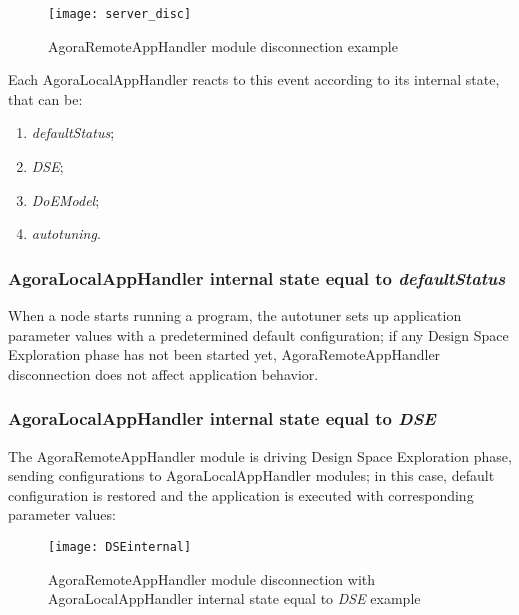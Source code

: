 \begin{figure}[H]

    \centering
    \texttt{[image: server\_disc]}
    \caption{AgoraRemoteAppHandler module disconnection example}
    
\end{figure}

Each AgoraLocalAppHandler reacts to this event according to its internal state, that can be:

\begin{enumerate}

    \item \textit{defaultStatus};
    
    \item \textit{DSE};
    
    \item \textit{DoEModel};
    
    \item \textit{autotuning}.

\end{enumerate}


\subsubsection{AgoraLocalAppHandler internal state equal to \textit{defaultStatus}}

When a node starts running a program, the autotuner sets up application parameter values with a predetermined default configuration; if any Design Space Exploration phase has not been started yet, AgoraRemoteAppHandler disconnection does not affect application behavior.


\subsubsection{AgoraLocalAppHandler internal state equal to \textit{DSE}}

The AgoraRemoteAppHandler module is driving Design Space Exploration phase, sending configurations to AgoraLocalAppHandler modules; in this case, default configuration is restored and the application is executed with corresponding parameter values:

\begin{figure}[H]

    \centering
    \texttt{[image: DSEinternal]}
    \caption{AgoraRemoteAppHandler module disconnection with A\-go\-ra\-Local\-App\-Handler internal state equal to \textit{DSE} example}
    
\end{figure}


